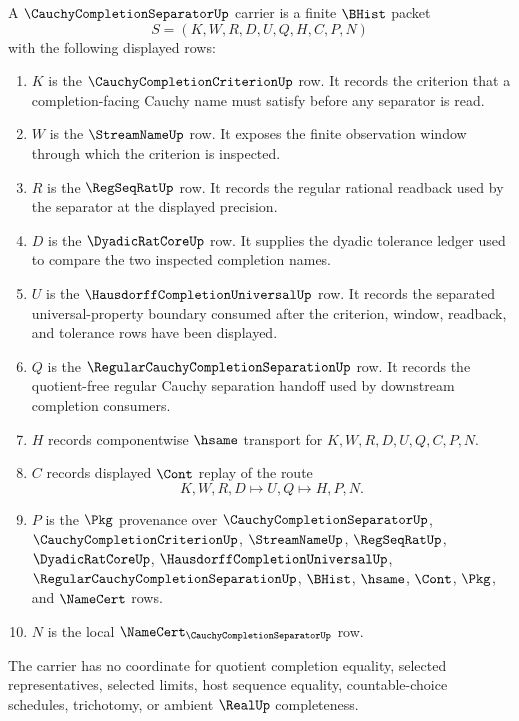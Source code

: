 \begin{definition}
\label{def:cauchy-completion-separator-carrier}
A $\CauchyCompletionSeparatorUp$ carrier is a finite $\BHist$ packet
$$
S=(K,W,R,D,U,Q,H,C,P,N)
$$
with the following displayed rows:
\begin{enumerate}
\item $K$ is the $\CauchyCompletionCriterionUp$ row. It records the criterion that a completion-facing Cauchy name must satisfy before any separator is read.
\item $W$ is the $\StreamNameUp$ row. It exposes the finite observation window through which the criterion is inspected.
\item $R$ is the $\RegSeqRatUp$ row. It records the regular rational readback used by the separator at the displayed precision.
\item $D$ is the $\DyadicRatCoreUp$ row. It supplies the dyadic tolerance ledger used to compare the two inspected completion names.
\item $U$ is the $\HausdorffCompletionUniversalUp$ row. It records the separated universal-property boundary consumed after the criterion, window, readback, and tolerance rows have been displayed.
\item $Q$ is the $\RegularCauchyCompletionSeparationUp$ row. It records the quotient-free regular Cauchy separation handoff used by downstream completion consumers.
\item $H$ records componentwise $\hsame$ transport for $K,W,R,D,U,Q,C,P,N$.
\item $C$ records displayed $\Cont$ replay of the route
$$
K,W,R,D \longmapsto U,Q \longmapsto H,P,N .
$$
\item $P$ is the $\Pkg$ provenance over $\CauchyCompletionSeparatorUp$, $\CauchyCompletionCriterionUp$, $\StreamNameUp$, $\RegSeqRatUp$, $\DyadicRatCoreUp$, $\HausdorffCompletionUniversalUp$, $\RegularCauchyCompletionSeparationUp$, $\BHist$, $\hsame$, $\Cont$, $\Pkg$, and $\NameCert$ rows.
\item $N$ is the local $\NameCert_{\CauchyCompletionSeparatorUp}$ row.
\end{enumerate}
The carrier has no coordinate for quotient completion equality, selected representatives, selected limits, host sequence equality, countable-choice schedules, trichotomy, or ambient $\RealUp$ completeness.
\end{definition}

